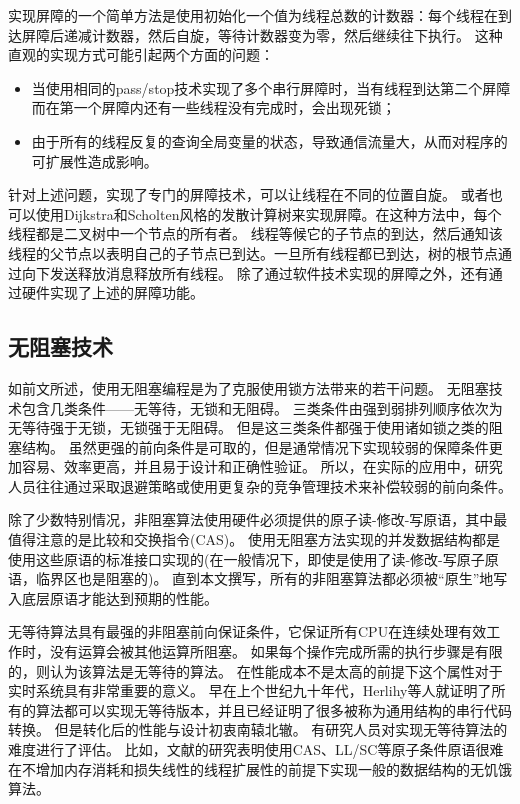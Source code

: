 实现屏障的一个简单方法是使用初始化一个值为线程总数的计数器：每个线程在到达屏障后递减计数器，然后自旋，等待计数器变为零，然后继续往下执行。
这种直观的实现方式可能引起两个方面的问题：
\begin{itemize}
	\item 当使用相同的pass/stop技术实现了多个串行屏障时，当有线程到达第二个屏障而在第一个屏障内还有一些线程没有完成时，会出现死锁；
	\item 由于所有的线程反复的查询全局变量的状态，导致通信流量大，从而对程序的可扩展性造成影响。
\end{itemize}
针对上述问题，实现了专门的屏障技术，可以让线程在不同的位置自旋\cite{brooks1986butterfly,hensgen1988two,mellor1992fast,tseng2016scalable}。
或者也可以使用Dijkstra和Scholten风格的发散计算树来实现屏障\cite{dijkstra1980termination}。在这种方法中，每个线程都是二叉树中一个节点的所有者。
线程等候它的子节点的到达，然后通知该线程的父节点以表明自己的子节点已到达。一旦所有线程都已到达，树的根节点通过向下发送释放消息释放所有线程。
除了通过软件技术实现的屏障之外，还有通过硬件实现了上述的屏障功能\cite{solihin2015fundamentals}。

\subsection{无阻塞技术}

如前文所述，使用无阻塞编程是为了克服使用锁方法带来的若干问题。
无阻塞技术包含几类条件——无等待\cite{lamport1974new,herlihy1991wait}，无锁\cite{herlihy1991wait}和无阻碍\cite{herlihy2003obstruction}。
三类条件由强到弱排列顺序依次为无等待强于无锁，无锁强于无阻碍。
但是这三类条件都强于使用诸如锁之类的阻塞结构。
虽然更强的前向条件是可取的，但是通常情况下实现较弱的保障条件更加容易、效率更高，并且易于设计和正确性验证。
所以，在实际的应用中，研究人员往往通过采取退避策略\cite{agarwal1989adaptive}或使用更复杂的竞争管理技术\cite{herlihy2003software}来补偿较弱的前向条件。

除了少数特别情况，非阻塞算法使用硬件必须提供的原子读-修改-写原语，其中最值得注意的是比较和交换指令(CAS)。
使用无阻塞方法实现的并发数据结构都是使用这些原语的标准接口实现的(在一般情况下，即使是使用了读-修改-写原子原语，临界区也是阻塞的)。
直到本文撰写，所有的非阻塞算法都必须被“原生”地写入底层原语才能达到预期的性能。

无等待算法具有最强的非阻塞前向保证条件，它保证所有CPU在连续处理有效工作时，没有运算会被其他运算所阻塞。
如果每个操作完成所需的执行步骤是有限的，则认为该算法是无等待的算法。
在性能成本不是太高的前提下这个属性对于实时系统具有非常重要的意义。
早在上个世纪九十年代，Herlihy等人就证明了所有的算法都可以实现无等待版本\cite{herlihy1988impossibility}，并且已经证明了很多被称为通用结构的串行代码转换。
但是转化后的性能与设计初衷南辕北辙。
有研究人员对实现无等待算法的难度进行了评估。
比如，文献\cite{fich2004inherent}的研究表明使用CAS、LL/SC等原子条件原语很难在不增加内存消耗和损失线性的线程扩展性的前提下实现一般的数据结构的无饥饿算法。

